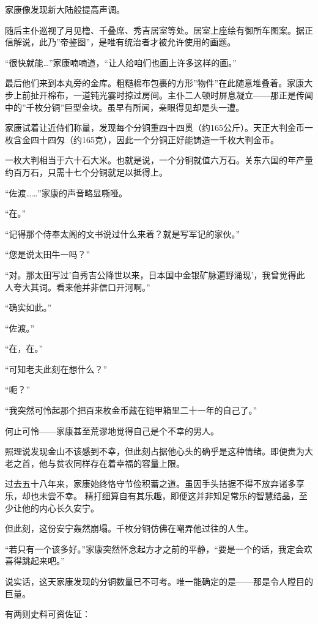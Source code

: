\documentclass[
]{book}
\begin{document}
家康像发现新大陆般提高声调。

随后主仆巡视了月见橹、千叠席、秀吉居室等处。居室上座绘有御所车图案。据正信解说，此乃''帝鉴图''，是唯有统治者才被允许使用的画题。

``很快就能\ldots{}''家康喃喃道，``让人给咱们也画上许多这样的画。''

最后他们来到本丸旁的金库。粗糙棉布包裹的方形''物件''在此随意堆叠着。家康大步上前扯开棉布，一道钝光霎时掠过房间。主仆二人顿时屏息凝立------那正是传闻中的''千枚分铜''巨型金块。虽早有所闻，亲眼得见却是头一遭。

家康试着让近侍们称量，发现每个分铜重四十四贯（约165公斤）。天正大判金币一枚含金四十四匁（约165克），因此一个分铜正好能铸造一千枚大判金币。

一枚大判相当于六十石大米。也就是说，一个分铜就值六万石。关东六国的年产量约百万石，只需十七个分铜就足以抵得上。

``佐渡\ldots\ldots{}''家康的声音略显嘶哑。

``在。''

``记得那个侍奉太阁的文书说过什么来着？就是写军记的家伙。''

``您是说太田牛一吗？''

``对。那太田写过'自秀吉公降世以来，日本国中金银矿脉遍野涌现'，我曾觉得此人夸大其词。看来他并非信口开河啊。''

``确实如此。''

``佐渡。''

``在，在。''

``可知老夫此刻在想什么？''

``呃？''

``我突然可怜起那个把百来枚金币藏在铠甲箱里二十一年的自己了。''

何止可怜------家康甚至荒谬地觉得自己是个不幸的男人。

照理说发现金山不该感到不幸，但此刻占据他心头的确乎是这种情绪。即便贵为大老之首，他与贫农同样存在着幸福的容量上限。

过去五十八年来，家康始终恪守节俭积蓄之道。虽因手头拮据不得不放弃诸多享乐，却也未尝不幸。 精打细算自有其乐趣，即便这并非知足常乐的智慧结晶，至少让他的内心长久安宁。

但此刻，这份安宁轰然崩塌。千枚分铜仿佛在嘲弄他过往的人生。

``若只有一个该多好。''家康突然怀念起方才之前的平静，``要是一个的话，我定会欢喜得跳起来吧。''

说实话，这天家康发现的分铜数量已不可考。唯一能确定的是------那是令人瞠目的巨量。

有两则史料可资佐证：
\end{document}
